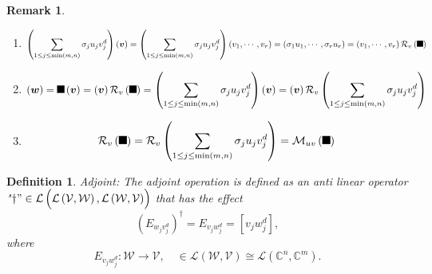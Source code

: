\documentclass[aps,preprint]{revtex4}%
\providecommand{\U}[1]{\protect\rule{.1in}{.1in}}
\newtheorem{definition}[theorem]{Definition}
\newtheorem{remark}[theorem]{Remark}
\begin{document}
\begin{remark}
\begin{enumerate}
\item
\begin{equation}
\left(  \sum_{1\leq j\leq\min\left(  m,n\right)  }\sigma_{j}u_{j}v_{j}%
^{d}\right)  \left(  \boldsymbol{v}\right)  =\left(  \sum_{1\leq j\leq
\min\left(  m,n\right)  }\sigma_{j}u_{j}v_{j}^{d}\right)  \left(  v_{1}%
,\cdots,v_{r}\right)  =\left(  \sigma_{1}u_{1},\cdots,\sigma_{r}u_{r}\right)
=\left(  v_{1},\cdots,v_{r}\right)  \mathcal{R}_{v}\left(  \U{3a3} \right)
\end{equation}


\item
\begin{equation}
\left(  \boldsymbol{w}\right)  =\U{3a3} \left(  \boldsymbol{v}\right)
=\left(  \boldsymbol{v}\right)  \mathcal{R}_{v}\left(  \U{3a3} \right)
=\left(  \sum_{1\leq j\leq\min\left(  m,n\right)  }\sigma_{j}u_{j}v_{j}%
^{d}\right)  \left(  \boldsymbol{v}\right)  =\left(  \boldsymbol{v}\right)
\mathcal{R}_{v}\left(  \sum_{1\leq j\leq\min\left(  m,n\right)  }\sigma
_{j}u_{j}v_{j}^{d}\right)
\end{equation}


\item
\begin{equation}
\mathcal{R}_{v}\left(  \U{3a3} \right)  =\mathcal{R}_{v}\left(  \sum_{1\leq
j\leq\min\left(  m,n\right)  }\sigma_{j}u_{j}v_{j}^{d}\right)  =\mathcal{M}%
_{uv}\left(  \U{3a3} \right)
\end{equation}

\end{enumerate}
\end{remark}

\begin{definition}
Adjoint: The adjoint operation is \emph{defined} as an anti linear operator
"$\dagger"\in\mathcal{L}\left(  \overset{}{\mathcal{L}\left(  \mathcal{V}%
,\mathcal{W}\right)  ,\mathcal{L}\left(  \mathcal{W},\mathcal{V}\right)
}\right)  $ that has the effect
\begin{equation}
\left(  E_{w_{j}v_{j}^{d}}\right)  ^{\dagger}=E_{v_{j}w_{j}^{d}}=\left[
v_{j}w_{j}^{d}\right]  ,
\end{equation}
where
\begin{equation}
E_{v_{j}w_{j}^{d}}:\mathcal{W}\rightarrow\mathcal{V},\quad\in\mathcal{L}%
\left(  \mathcal{W},\mathcal{V}\right)  \cong\mathcal{L}\left(  \mathbb{C}%
^{n},\mathbb{C}^{m}\right)  .
\end{equation}

\end{definition}
\end{document}
